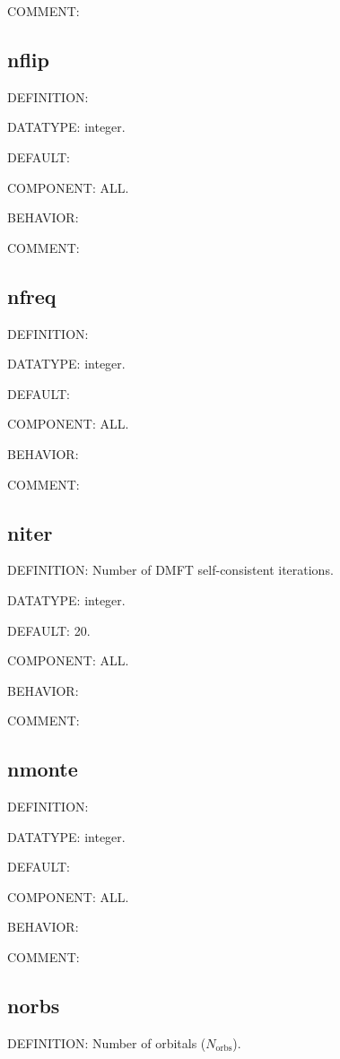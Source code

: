 {\color{olive}COMMENT:}

\subsection{nflip}
{\color{red}DEFINITION:}

{\color{green}DATATYPE:} integer.

{\color{blue}DEFAULT:}

{\color{brown}COMPONENT:} ALL.

{\color{purple}BEHAVIOR:}

{\color{olive}COMMENT:}

\subsection{nfreq}
{\color{red}DEFINITION:}

{\color{green}DATATYPE:} integer.

{\color{blue}DEFAULT:}

{\color{brown}COMPONENT:} ALL.

{\color{purple}BEHAVIOR:}

{\color{olive}COMMENT:}

\subsection{niter}
{\color{red}DEFINITION:} Number of DMFT self-consistent iterations.

{\color{green}DATATYPE:} integer.

{\color{blue}DEFAULT:} 20.

{\color{brown}COMPONENT:} ALL.

{\color{purple}BEHAVIOR:}

{\color{olive}COMMENT:}

\subsection{nmonte}
{\color{red}DEFINITION:}

{\color{green}DATATYPE:} integer.

{\color{blue}DEFAULT:}

{\color{brown}COMPONENT:} ALL.

{\color{purple}BEHAVIOR:}

{\color{olive}COMMENT:}

\subsection{norbs}
{\color{red}DEFINITION:} Number of orbitals ($N_{\text{orbs}}$).

